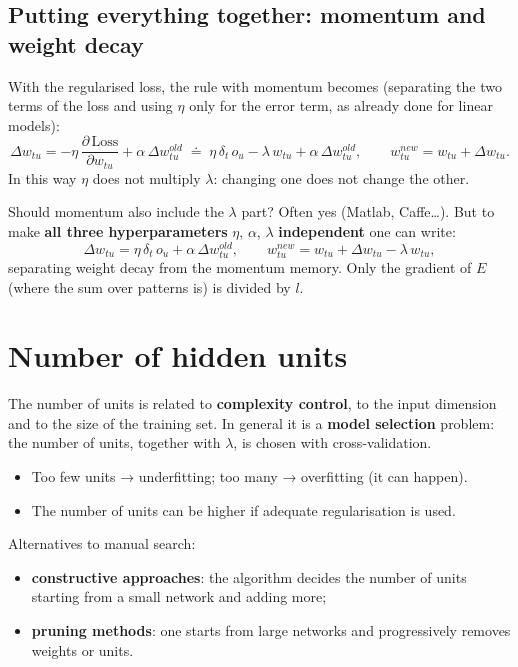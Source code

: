 \subsection{Putting everything together: momentum and weight
decay}\label{mettere-tutto-insieme-momentum-e-weight-decay}

With the regularised loss, the rule with momentum becomes (separating
the two terms of the loss and using \(\eta\) only for the error term,
as already done for linear models): \[
\Delta w_{tu} = -\eta\,\frac{\partial\,\text{Loss}}{\partial w_{tu}} + \alpha\,\Delta w_{tu}^{old} \;\doteq\; \eta\,\delta_t\,o_u - \lambda\,w_{tu} + \alpha\,\Delta w_{tu}^{old}, \qquad w_{tu}^{new} = w_{tu} + \Delta w_{tu}.
\] In this way \(\eta\) does not multiply \(\lambda\): changing one
does not change the other.

Should momentum also include the \(\lambda\) part? Often yes (Matlab,
Caffe\ldots). But to make \textbf{all three hyperparameters} \(\eta\),
\(\alpha\), \(\lambda\) \textbf{independent} one can write: \[
\Delta w_{tu} = \eta\,\delta_t\,o_u + \alpha\,\Delta w_{tu}^{old}, \qquad w_{tu}^{new} = w_{tu} + \Delta w_{tu} - \lambda\,w_{tu},
\] separating weight decay from the momentum memory. Only the gradient
of \(E\) (where the sum over patterns is) is divided by \(l\).

\section{Number of hidden units}\label{numero-di-unituxe0-nascoste}

The number of units is related to \textbf{complexity control}, to the
input dimension and to the size of the training set. In general it is
a \textbf{model selection} problem: the number of units, together with
\(\lambda\), is chosen with cross-validation.

\begin{itemize}
\tightlist
\item
  Too few units → underfitting; too many → overfitting (it can
  happen).
\item
  The number of units can be higher if adequate regularisation is
  used.
\end{itemize}

Alternatives to manual search:

\begin{itemize}
\tightlist
\item
  \textbf{constructive approaches}: the algorithm decides the number of
  units starting from a small network and adding more;
\item
  \textbf{pruning methods}: one starts from large networks and
  progressively removes weights or units.
\end{itemize}

